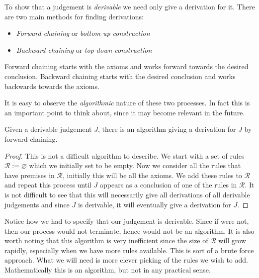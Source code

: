 \begin{remark}
    To show that a judgement is \emph{derivable} we need only give a derivation for it. There are two main methods for finding derivations:
    \begin{itemize}
        \item \emph{Forward chaining} or \emph{bottom-up construction}
        \item \emph{Backward chaining} or \emph{top-down construction}
    \end{itemize}
    
    Forward chaining starts with the axioms and works forward towards the desired conclusion. Backward chaining starts with the desired conclusion and works backwards towards the axioms.
\end{remark}

It is easy to observe the \emph{algorithmic} nature of these two processes. In fact this is an important point to think about, since it may become relevant in the future.

\begin{lemma}
    Given a derivable judgement $J$, there is an algorithm giving a derivation for $J$ by forward chaining.
\end{lemma}

\begin{proof}
    This is not a difficult algorithm to describe. We start with a set of rules $\mathcal{R} := \varnothing $ which we initially set to be empty. Now we consider all the rules that have premises in $\mathcal{R}$, initially this will be all the axioms. We add these rules to $\mathcal{R}$ and repeat this process until $J$ appears as a conclusion of one of the rules in $\mathcal{R}$. It is not difficult to see that this will necessarily give all derivations of all derivable judgements and since $J$ is derivable, it will eventually give a derivation for $J$.
\end{proof}

\begin{remark}
    Notice how we had to specify that our judgement is derivable. Since if were not, then our process would not terminate, hence would not be an algorithm. It is also worth noting that this algorithm is very inefficient since the size of $\mathcal{R}$ will grow rapidly, especially when we have more rules available. This is sort of a brute force approach. What we will need is more clever picking of the rules we wish to add. Mathematically this is an algorithm, but not in any practical sense.
\end{remark}

